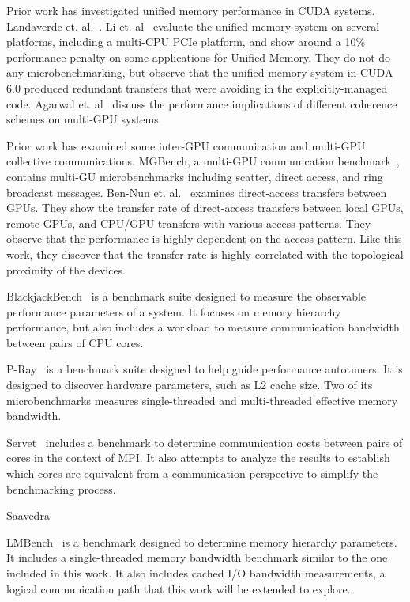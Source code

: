 Prior work has investigated unified memory performance in CUDA systems.
Landaverde et. al.~\cite{landaverde2014investigation}.
Li et. al~\cite{li2015evaluation} evaluate the unified memory system on several platforms, including a multi-CPU PCIe platform, and show around a 10\% performance penalty on some applications for Unified Memory.
They do not do any microbenchmarking, but observe that the unified memory system in CUDA 6.0 produced redundant transfers that were avoiding in the explicitly-managed code.
Agarwal et. al~\cite{agarwal2015unlocking} discuss the performance implications of different coherence schemes on multi-GPU systems

Prior work has examined some inter-GPU communication and multi-GPU collective communications.
MGBench, a multi-GPU communication benchmark~\cite{bennun2016mgbench}, contains multi-GU microbenchmarks including scatter, direct access, and ring broadcast messages.
Ben-Nun et. al.~\cite{ben2017groute} examines direct-access transfers between GPUs.
They show the transfer rate of direct-access transfers between local GPUs, remote GPUs, and CPU/GPU transfers with various access patterns.
They observe that the performance is highly dependent on the access pattern.
Like this work, they discover that the transfer rate is highly correlated with the topological proximity of the devices.

BlackjackBench~\cite{danalis2012blackjackbench} is a benchmark suite designed to measure the observable performance parameters of a system.
It focuses on memory hierarchy performance, but also includes a workload to measure communication bandwidth between pairs of CPU cores.

P-Ray~\cite{duchateau2008p} is a benchmark suite designed to help guide performance autotuners.
It is designed to discover hardware parameters, such as L2 cache size.
Two of its microbenchmarks measures single-threaded and multi-threaded effective memory bandwidth.

Servet~\cite{gonzalez2010servet} includes a benchmark to determine communication costs between pairs of cores in the context of MPI.
It also attempts to analyze the results to establish which cores are equivalent from a communication perspective to simplify the benchmarking process.

Saavedra

LMBench~\cite{mcvoy1996lmbench} is a benchmark designed to determine memory hierarchy parameters.
It includes a single-threaded memory bandwidth benchmark similar to the one included in this work.
It also includes cached I/O bandwidth measurements, a logical communication path that this work will be extended to explore.

